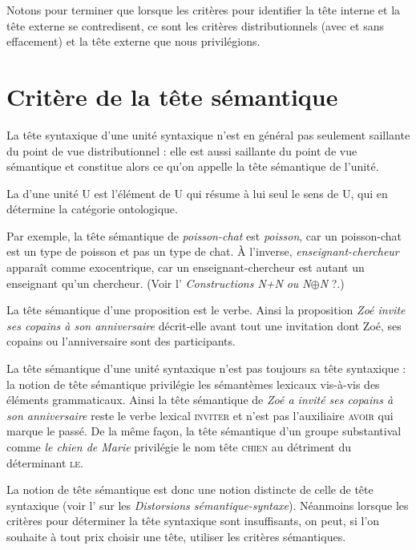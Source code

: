 Notons pour terminer que lorsque les critères pour identifier la tête interne et la tête externe se contredisent, ce sont les critères distributionnels (avec et sans effacement) et la tête externe que nous privilégions.

\section{Critère de la tête sémantique}\label{sec:3.3.17}

La tête syntaxique d’une unité syntaxique n’est en général pas seulement saillante du point de vue distributionnel : elle est aussi saillante du point de vue sémantique et constitue alors ce qu’on appelle la tête sémantique de l’unité.

\begin{styleLivreImportant}
La  d’une unité U est l’élément de U qui résume à lui seul le sens de U, qui en détermine la catégorie ontologique.
\end{styleLivreImportant}

Par exemple, la tête sémantique de \textit{poisson-chat} est \textit{poisson}, car un poisson-chat est un type de poisson et pas un type de chat. À l’inverse, \textit{enseignant-chercheur} apparaît comme exocentrique, car un enseignant-chercheur est autant un enseignant qu’un chercheur. (Voir l’ \textit{Constructions N+N} \textit{ou N}${\oplus}$\textit{N} ?.)

La tête sémantique d’une proposition est le verbe. Ainsi la proposition \textit{Zoé invite ses copains à son anniversaire} décrit-elle avant tout une invitation dont Zoé, ses copains ou l’anniversaire sont des participants.

La tête sémantique d’une unité syntaxique n’est pas toujours sa tête syntaxique : la notion de tête sémantique privilégie les sémantèmes lexicaux vis-à-vis des éléments grammaticaux. Ainsi la tête sémantique de \textit{Zoé a invité ses copains à son anniversaire} reste le verbe lexical \textsc{inviter} et n’est pas l’auxiliaire \textsc{avoir} qui marque le passé. De la même façon, la tête sémantique d’un groupe substantival comme \textit{le chien de Marie} privilégie le nom tête \textsc{chien} au détriment du déterminant \textsc{le}.

La notion de tête sémantique est donc une notion distincte de celle de tête syntaxique (voir l’ sur les \textit{Distorsions sémantique-syntaxe}). Néanmoins lorsque les critères pour déterminer la tête syntaxique sont insuffisants, on peut, si l’on souhaite à tout prix choisir une tête, utiliser les critères sémantiques.

